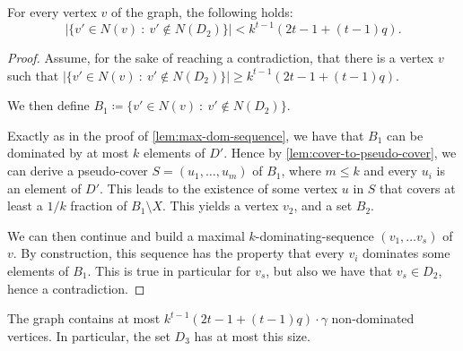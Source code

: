 \begin{lemma}\label{lem:smalldegree}
  For every vertex $v$ of the graph, the following holds:
  \[|\{v'\in N(v) ~:~ v' \not\in N(D_2)\}| < k^{t-1}(2t-1+(t-1)q).\]

\end{lemma}
\begin{proof}
  Assume, for the sake of reaching a contradiction, that there is a vertex $v$
  such that $|\{v'\in N(v) ~:~ v' \not\in N(D_2)\}| \ge  k^{t-1}(2t-1+(t-1)q)$.

  We then define $B_1\coloneqq \{v'\in N(v) ~:~ v' \not\in N(D_2)\}$.

  Exactly as in the proof of \cref{lem:max-dom-sequence}, we have that $B_1$
  can be dominated by at most $k$ elements of $D'$. Hence by
  \cref{lem:cover-to-pseudo-cover}, we can derive a
  pseudo-cover $S=(u_1,\ldots,u_m)$ of
  $B_1$, where $m\le k$ and every $u_i$ is an element of $D'$. This
  leads to the existence of some vertex $u$ in $S$ that covers at least a
  $1/k$ fraction of $B_1\setminus X$. This yields a vertex $v_2$, and a set $B_2$.

  We can then continue and build a maximal $k$-dominating-sequence
  $(v_1,\ldots v_s)$ of $v$. By construction, this sequence has the property
  that every $v_i$ dominates some elements of $B_1$. This is true in particular
  for $v_s$, but also we have that $v_s\in D_2$, hence a contradiction.

\end{proof}

\begin{corollary}\label{crl:d3}
The graph contains at most $k^{t-1}(2t-1+(t-1)q)\cdot \gamma$ non-dominated
vertices. In particular, the set $D_3$ has at most this size.
\end{corollary}
